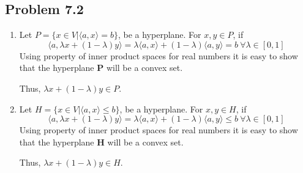 \documentclass[letterpaper,12pt]{article}
\theoremstyle{definition}
\begin{document}
\subsection*{Problem 7.2}
\begin{enumerate}
\item
Let $ P = \{x \in V | \langle a,x\rangle = b\}$, be a hyperplane. For  $x,y \in P $,  if
\begin{equation*}
\langle a,\lambda x + (1-\lambda)y\rangle=\lambda\langle a,x\rangle + (1-\lambda)\langle a,y\rangle = b  \  \forall \lambda \in [0,1]
\end{equation*}
Using property of inner product spaces for real numbers it is easy to show that the hyperplane \textbf{P} will be a convex set. 

Thus, $\lambda x + (1-\lambda)y \in P$. 

\item
Let $ H = \{x \in V | \langle a,x\rangle \leq b\}$, be a hyperplane. For  $x,y \in H $,  if
\begin{equation*}
\langle a,\lambda x + (1-\lambda)y\rangle=\lambda\langle a,x\rangle + (1-\lambda)\langle a,y\rangle \leq b  \  \forall \lambda \in [0,1]
\end{equation*}
Using property of inner product spaces for real numbers it is easy to show that the hyperplane \textbf{H} will be a convex set. 

Thus, $\lambda x + (1-\lambda)y \in H$. 

\end{enumerate}
\end{document}
